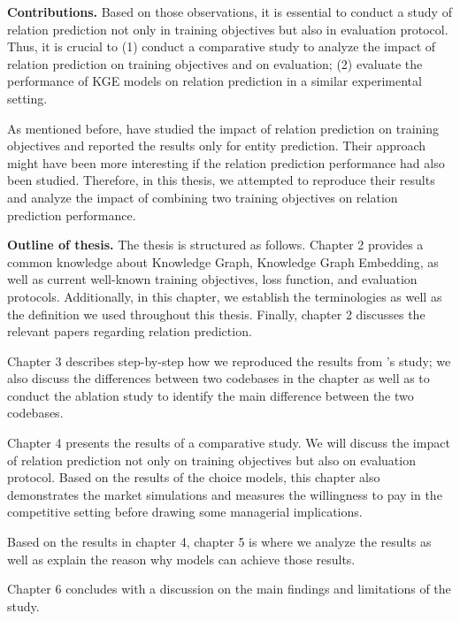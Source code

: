 \noindent\textbf{Contributions.} Based on those observations, it is essential to conduct a study of relation prediction not only in training objectives but also in evaluation protocol. Thus, it is crucial to (1) conduct a comparative study to analyze the impact of relation prediction on training objectives and on evaluation; (2) evaluate the performance of KGE models on relation prediction in a similar experimental setting. 

As mentioned before, \citet{chen2021relation} have studied the impact of relation prediction on training objectives and reported the results only for entity prediction. Their approach might have been more interesting if the relation prediction performance had also been studied. Therefore, in this thesis, we attempted to reproduce their results and analyze the impact of combining two training objectives on relation prediction performance. 
\newline

\noindent\textbf{Outline of thesis.} The thesis is structured as follows. Chapter 2 provides a common knowledge about Knowledge Graph, Knowledge Graph Embedding, as well as current well-known training objectives, loss function, and evaluation protocols. Additionally, in this chapter, we establish the terminologies as well as the definition we used throughout this thesis. Finally, chapter 2 discusses the relevant papers regarding relation prediction. 

Chapter 3 describes step-by-step how we reproduced the results from \citet{chen2021relation}'s study; we also discuss the differences between two codebases in the chapter as well as to conduct the ablation study to identify the main difference between the two codebases. 

Chapter 4 presents the results of a comparative study. We will discuss the impact of relation prediction not only on training objectives but also on evaluation protocol. Based on the results of the choice models, this chapter also demonstrates the market simulations and measures the willingness to pay in the competitive setting before drawing some managerial implications. 

Based on the results in chapter 4, chapter 5 is where we analyze the results as well as explain the reason why models can achieve those results.

Chapter 6 concludes with a discussion on the main findings and limitations of the study.





